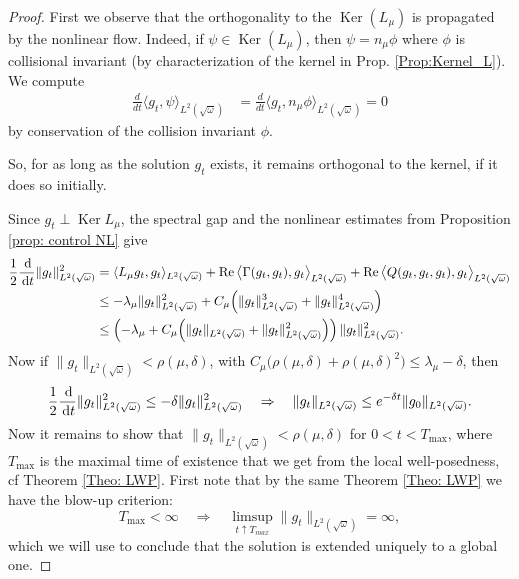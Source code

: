 \documentclass[reqno,11pt,letterpaper]{amsart}
\numberwithin{equation}{section}
\newcommand{\dd}{\, {\rm d}}
\begin{document}
\begin{proof}
First we observe that the orthogonality to the $\operatorname{Ker}(L_\mu)$ is propagated by the
nonlinear flow. Indeed, if $\psi \in \operatorname{Ker}(L_\mu)$, then $\psi=n_\mu \phi$ where $\phi$ is collisional invariant (by characterization of the kernel in Prop. \ref{Prop:Kernel_L}). We compute 
\begin{align*}
\frac{d}{dt}\langle g_t,\psi\rangle_{L^2(\sqrt{\omega})}&=
\frac{d}{dt}\langle g_t,n_\mu\phi\rangle_{L^2(\sqrt{\omega})}=0
\end{align*}
by conservation of the collision invariant $\phi$.

So, for as long as the solution $g_t$ exists, it remains orthogonal to the kernel, if it does so initially. 

Since $g_t\perp \operatorname{Ker} L_\mu$, the spectral gap and the nonlinear estimates from Proposition \ref{prop: control NL} give
\begin{equation}
\begin{split}
 \frac{1}{2}\frac{\dd}{\dd t}\|g_t\|_{L^2(\sqrt{\omega})}^2
&=\langle L_\mu g_t,g_t\rangle_{L^2(\sqrt{\omega})} +
\operatorname{Re}
\big\langle\Gamma (g_t,g_t),g_t \big\rangle_{L^2(\sqrt{\omega})} +
\operatorname{Re}
\big\langle Q (g_t,g_t,g_t),g_t \big\rangle_{L^2(\sqrt{\omega})} \\
 &\leq - \lambda_\mu \|g_t\|_{L^2(\sqrt{\omega})}^2 +
C_{\mu} \Big( \|g_t\|_{L^2(\sqrt{\omega})}^3+
 \|g_t\|_{L^2(\sqrt{\omega})}^4 \Big) \\
 &\leq
 \left( -\lambda_\mu+C_\mu\Big( \|g_t\|_{L^2(\sqrt{\omega})} +\|g_t\|_{L^2(\sqrt{\omega})} ^2 \Big)
\right)
\|g_t\|_{L^2(\sqrt{\omega})}^2.
\end{split}
\end{equation}
Now if $\|g_t\|_{L^2(\sqrt{\omega})} < \rho(\mu,\delta)$, with 
$C_\mu\big(\rho(\mu,\delta)+   \rho(\mu,\delta)^2 \big)\leq \lambda_\mu-\delta$, then 
\begin{align} \label{eq:GWP_proof1}
\frac{1}{2}\frac{\dd}{\dd t}\|g_t\|_{L^2(\sqrt{\omega})}^2 \leq -\delta  \|g_t\|_{L^2(\sqrt{\omega})}^2 \quad \Rightarrow\quad \|g_t\|_{L^2(\sqrt{\omega})}
\leq e^{-\delta t} \|g_0\|_{L^2(\sqrt{\omega})}.
\end{align}
Now it remains to show that $\|g_t\|_{L^2(\sqrt{\omega})} < \rho(\mu,\delta)$ for $0<t<T_{\max}$, where $T_{\max}$ is the maximal time of existence that we get from the local well-posedness, cf  Theorem \ref{Theo: LWP}. First note that by the same Theorem \ref{Theo: LWP} we have the blow-up criterion: 
$$ T_{\max}<\infty\quad \Rightarrow \quad \limsup_{t \uparrow T_{max}} \|g_t\|_{L^2(\sqrt{\omega})} = \infty, $$
which we will use to conclude that the solution is extended uniquely to a global one.


\end{proof}
\end{document}
